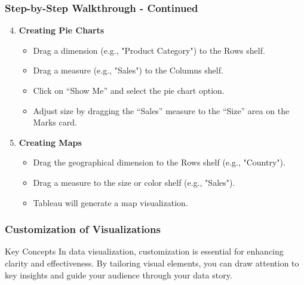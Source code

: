 \documentclass[aspectratio=169]{beamer}
\begin{document}
\begin{frame}[fragile]
    \frametitle{Step-by-Step Walkthrough - Continued}
    \begin{enumerate}
        \setcounter{enumi}{3} %
        \item \textbf{Creating Pie Charts}
        \begin{itemize}
            \item Drag a dimension (e.g., "Product Category") to the Rows shelf.
            \item Drag a measure (e.g., "Sales") to the Columns shelf.
            \item Click on “Show Me” and select the pie chart option.
            \item Adjust size by dragging the “Sales” measure to the “Size” area on the Marks card.
        \end{itemize}
        
        \item \textbf{Creating Maps}
        \begin{itemize}
            \item Drag the geographical dimension to the Rows shelf (e.g., "Country").
            \item Drag a measure to the size or color shelf (e.g., "Sales").
            \item Tableau will generate a map visualization.
        \end{itemize}
    \end{enumerate}
\end{frame}

\begin{frame}[fragile]
    \frametitle{Customization of Visualizations}
    \begin{block}{Key Concepts}
        In data visualization, customization is essential for enhancing clarity and effectiveness. By tailoring visual elements, you can draw attention to key insights and guide your audience through your data story.
    \end{block}
\end{frame}
\end{document}
